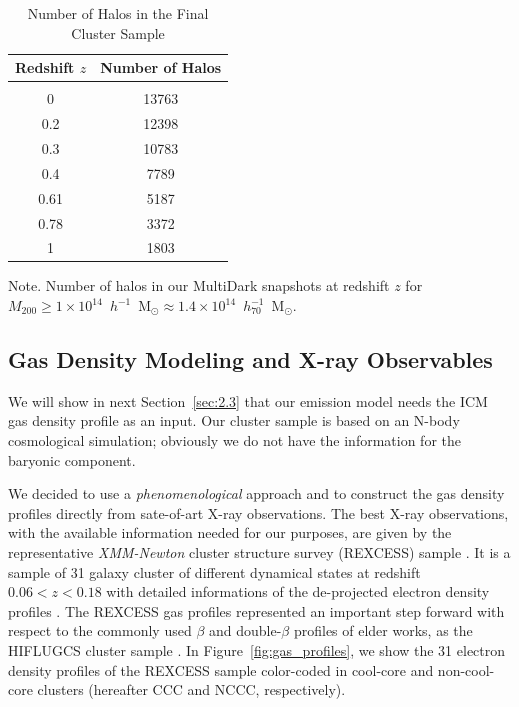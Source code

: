 \documentclass[traditabstract]{aa}
\begin{document}
\begin{table}[hbt!]
\begin{center}
\caption{Number of Halos in the Final Cluster Sample}
\medskip
\begin{tabular}{cc}
\hline
\phantom{\Big|}
Redshift $z$ & Number of Halos \\
\hline\\[-0.5em]
 0 &  13763\\
 0.2 &  12398\\
 0.3 &  10783\\ 
 0.4 &   7789\\ 
 0.61 &  5187\\ 
 0.78 &  3372\\ 
 1 &  1803\\[0.5em]
\hline
\end{tabular}
\label{tab:z}
\end{center}
\footnotesize{Note. Number of halos in our MultiDark snapshots at redshift $z$ for $M_{200}\geq1\times10^{14}$~$h^{-1}$~M$_{\odot}\approx1.4\times10^{14}$~$h_{70}^{-1}$~M$_{\odot}$. }
\end{table}


\subsection{Gas Density Modeling and X-ray Observables}
\label{sec:2.2}
We will show in next Section~\ref{sec:2.3} that our emission model needs the ICM gas density profile as an input.
Our cluster sample is based on an N-body cosmological simulation; obviously we do not have the information for the baryonic component.

We decided to use a \emph{phenomenological} approach and to construct the gas density profiles directly from sate-of-art X-ray observations.
The best X-ray observations, with the available information needed for our purposes, are given by the representative \emph{XMM-Newton} cluster structure survey (REXCESS) sample \citep{2008A&A...487..431C,2009A&A...498..361P}. It is a sample of 31 galaxy cluster of different dynamical states at redshift $0.06<z<0.18$ with detailed informations of the de-projected electron density profiles \citep{2008A&A...487..431C}. The REXCESS gas profiles represented an important step forward with respect to the commonly used $\beta$ and double-$\beta$ profiles of elder works, as the HIFLUGCS cluster sample \citep{2002ApJ...567..716R}. In Figure~\ref{fig:gas_profiles}, we show the 31 electron density profiles of the REXCESS sample color-coded in cool-core and non-cool-core clusters (hereafter CCC and NCCC, respectively).
\end{document}
